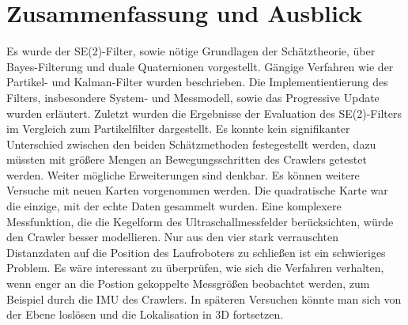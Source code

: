 \clearpage
\section{Zusammenfassung und Ausblick}
Es wurde der SE(2)-Filter, sowie nötige Grundlagen der Schätztheorie, über Bayes-Filterung und duale Quaternionen vorgestellt. Gängige Verfahren wie der Partikel- und Kalman-Filter wurden beschrieben. Die Implementientierung des Filters, insbesondere System- und Messmodell, sowie das Progressive Update wurden erläutert. Zuletzt wurden die Ergebnisse der Evaluation des SE(2)-Filters im Vergleich zum Partikelfilter dargestellt. Es konnte kein signifikanter Unterschied zwischen den beiden Schätzmethoden festegestellt werden, dazu müssten mit größere Mengen an Bewegungsschritten des Crawlers getestet werden. Weiter mögliche Erweiterungen sind denkbar. Es können weitere Versuche mit neuen Karten vorgenommen werden. Die quadratische Karte war die einzige, mit der echte Daten gesammelt wurden. Eine komplexere Messfunktion, die die Kegelform des Ultraschallmessfelder berücksichten, würde den Crawler besser modellieren.  Nur aus den vier stark verrauschten Distanzdaten auf die Position des Laufroboters zu schließen ist ein schwieriges Problem. Es wäre interessant zu überprüfen, wie sich die Verfahren verhalten, wenn enger an die Postion gekoppelte Messgrößen beobachtet werden, zum Beispiel durch die IMU des Crawlers. In späteren Versuchen könnte man sich von der Ebene loslösen und die Lokalisation in 3D fortsetzen.